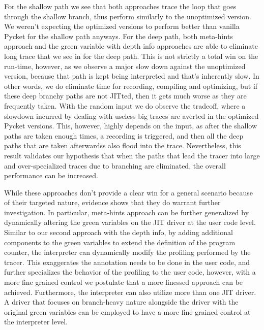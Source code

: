     \begin{paragraph-here}%
      For the shallow path we see that both approaches trace the loop that goes through the shallow branch, thus perform similarly to the unoptimized version. We weren't expecting the optimized versions to perform better than vanilla Pycket for the shallow path anyways.
      For the deep path, both meta-hints approach and the green variable with depth info approaches are able to eliminate long trace that we see in  for the deep path. This is not strictly a total win on the run-time, however, as we observe a major slow down against the unoptimized version, because that path is kept being interpreted and that's inherently slow. In other words, we do eliminate time for recording, compiling and optimizing, but if these deep branchy paths are not JITted, then it gets much worse as they are frequently taken. With the random input we do observe the tradeoff, where a slowdown incurred by dealing with useless big traces are averted in the optimized Pycket versions. This, however, highly depends on the input, as after the shallow paths are taken enough times, a recording is triggered, and then all the deep paths that are taken afterwardss also flood into the trace. Nevertheless, this result validates our hypothesis that when the paths that lead the tracer into large and over-specialized traces due to branching are eliminated, the overall performance can be increased.
    \end{paragraph-here}

    \begin{paragraph-here}%
      While these approaches don't provide a clear win for a general scenario because of their targeted nature, evidence shows that they do warrant further investigation. In particular, meta-hints approach can be further generalized by dynamically altering the green variables on the JIT driver at the user code level. Similar to our second approach with the depth info, by adding additional components to the green variables to extend the definition of the program counter, the interpreter can dynamically modify the profiling performed by the tracer. This exaggerates the annotation needs to be done in the user code, and further specializes the behavior of the profiling to the user code, however, with a more fine grained control we postulate that a more finessed approach can be achieved. Furthermore, the interpreter can also utilize more than one JIT driver. A driver that focuses on branch-heavy nature alongside the driver with the original green variables can be employed to have a more fine grained control at the interpreter level.
    \end{paragraph-here}

